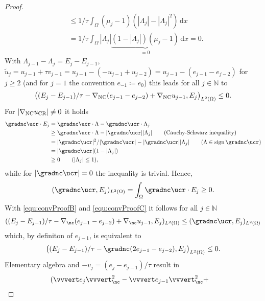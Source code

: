 \begin{proof}
\begin{align*}
    &\leq
    1/\tau \int_\Omega (\mu_j-1)(|\Lambda_j|-|\Lambda_j|^2)\,\mathrm dx\\
    &=
    1/\tau \int_\Omega |\Lambda_j|
    \underbrace{(1-|\Lambda_j|)(\mu_j-1)}_{=0}\,\mathrm dx =0.
  \end{align*}
  With $\Lambda_{j-1}-\Lambda_j=E_j-E_{j-1}$, 
  $\tilde{u}_j=u_{j-1}+\tau v_{j-1}=u_{j-1}-(-u_{j-1}+u_{j-2})=
  u_{j-1}-(e_{j-1}-e_{j-2})$
  for $j\geq 2$ (and for $j=1$ the convention $e_{-1}\coloneqq e_0$)
  this leads for all $j\in \mathbb N$ to
  \begin{align}
    \label{equ:convProofB}
    \big( (E_j-E_{j-1})/\tau-\nabla_\textup{NC}(e_{j-1}-e_{j-2})+
    \nabla_\textup{NC}u_{j-1},E_j\big)_{L^2(\Omega)}\leq 0.
  \end{align}
  For $|\nabla_\textup{NC}u_\textup{CR}|\neq 0$ it holds
  \begin{align*}
    \gradnc\ucr\cdot E_j 
    &=
    \gradnc\ucr\cdot\Lambda - \gradnc\ucr\cdot\Lambda_j\\
    &\geq 
    \gradnc\ucr\cdot\Lambda - |\gradnc\ucr||\Lambda_j| \tag{Cauchy-Schwarz inequality}\\
    &=
    |\gradnc\ucr|^2/|\gradnc\ucr|-|\gradnc\ucr||\Lambda_j| 
    \tag{$\Lambda\in\operatorname{sign}\gradnc\ucr$}\\
    &= 
    |\gradnc\ucr|(1-|\Lambda_j|)\\
    &\geq
    0 \tag{$|\Lambda_j|\leq 1$},
  \end{align*}
  while for $|\gradnc\ucr|=0$ the inequality is trivial.
  Hence,
  \begin{align}
    \label{equ:convProofC}
    (\gradnc\ucr,E_j)_{L^2(\Omega)}=\int_\Omega \gradnc\ucr\cdot E_j\geq 0.
  \end{align}
  With \eqref{equ:convProofB} and \eqref{equ:convProofC} it follows for all
  $j\in\mathbb N$
  \begin{align*}
    ( (E_j-E_{j-1})/\tau-\nabla_\nc(e_{j-1}-e_{j-2})+
    \nabla_\nc u_{j-1},E_j)_{L^2(\Omega)}
    \leq
    (\gradnc\ucr,E_j)_{L^2(\Omega)}
  \end{align*}
  which, by definiton of $e_{j-1}$, is equivalent to
  \begin{align}
    \label{equ:convProofD}
    \big( (E_j-E_{j-1})/\tau -\gradnc(2e_{j-1}-e_{j-2}),E_j\big)_{L^2(\Omega)}\leq 0.
  \end{align}
  Elementary algebra and $-v_j=(e_j-e_{j-1})/\tau$ result in
  \begin{align*}
    &(\vvvert e_j \vvvert^2_\nc   -
    \vvvert e_{j-1}\vvvert_\nc^2 +

\end{align*}
\end{proof}
